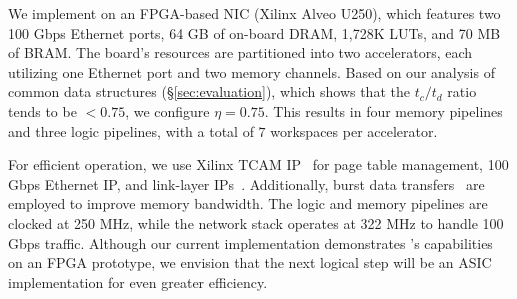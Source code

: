  We implement \pulse on an FPGA-based NIC (Xilinx Alveo U250), which features two 100 Gbps Ethernet ports, 64 GB of on-board DRAM, 1,728K LUTs, and 70 MB of BRAM. The board's resources are partitioned into two \pulse accelerators, each utilizing one Ethernet port and two memory channels. Based on our analysis of common data structures (\S\ref{sec:evaluation}), which shows that the $t_c/t_d$ ratio tends to be $< 0.75$, we configure $\eta = 0.75$. This results in four memory pipelines and three logic pipelines, with a total of $7$ workspaces per accelerator.

For efficient operation, we use Xilinx TCAM IP~\cite{tcam_ip} for page table management, 100 Gbps Ethernet IP, and link-layer IPs~\cite{xilinx_network}. Additionally, burst data transfers~\cite{burstdatatransfer} are employed to improve memory bandwidth. The logic and memory pipelines are clocked at 250 MHz, while the network stack operates at 322 MHz to handle 100 Gbps traffic. Although our current implementation demonstrates \pulse's capabilities on an FPGA prototype, we envision that the next logical step will be an ASIC implementation for even greater efficiency.

